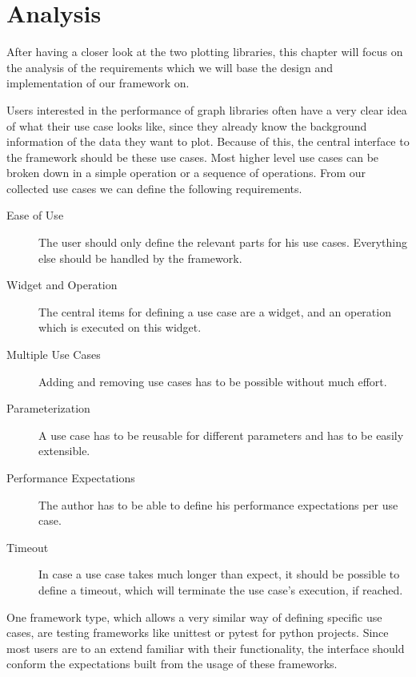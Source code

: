 
\section{Analysis}
\label{sec:application:analysis}

After having a closer look at the two plotting libraries, this chapter will
focus on the analysis of the requirements which we will base the design and
implementation of our framework on.

Users interested in the performance of graph libraries often have a very clear
idea of what their use case looks like, since they already know the background
information of the data they want to plot. Because of this, the central
interface to the framework should be these use cases. Most higher level use
cases can be broken down in a simple operation or a sequence of operations. From
our collected use cases we can define the following requirements.

\begin{description}
    \item[Ease of Use] 
        The user should only define the relevant parts for his use cases.
        Everything else should be handled by the framework.
    \item[Widget and Operation]
        The central items for defining a use case are a widget, and an operation
        which is executed on this widget.
    \item[Multiple Use Cases]
        Adding and removing use cases has to be possible without much effort.
    \item[Parameterization]
        A use case has to be reusable for different parameters and has to be
        easily extensible.
    \item[Performance Expectations]
        The author has to be able to define his performance expectations per use
        case.
    \item[Timeout]
        In case a use case takes much longer than expect, it should be possible
        to define a timeout, which will terminate the use case's execution, if
        reached.
\end{description}

One framework type, which allows a very similar way of defining specific use
cases, are testing frameworks like unittest or pytest for python projects. Since
most users are to an extend familiar with their functionality, the interface
should conform the expectations built from the usage of these frameworks.

